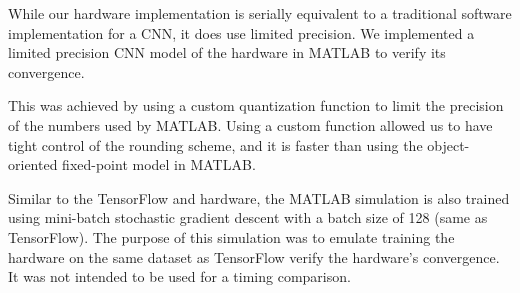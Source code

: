 While our hardware implementation is serially equivalent to a traditional software implementation for a CNN, it does use limited precision. We implemented a limited precision CNN model of the hardware in MATLAB to verify its convergence.

This was achieved by using a custom quantization function to limit the precision of the numbers used by MATLAB. Using a custom function allowed us to have tight control of the rounding scheme, and it is faster than using the object-oriented fixed-point model in MATLAB.

Similar to the TensorFlow and hardware, the MATLAB simulation is also trained using mini-batch stochastic gradient descent with a batch size of 128 (same as TensorFlow). The purpose of this simulation was to emulate training the hardware on the same dataset as TensorFlow verify the hardware's convergence. It was not intended to be used for a timing comparison.